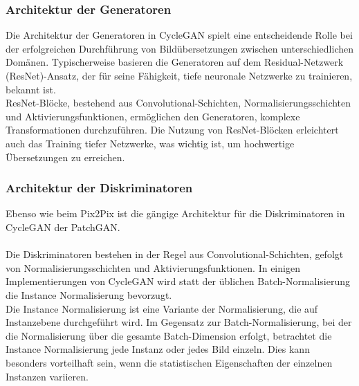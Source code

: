 \subsubsection{Architektur der Generatoren}
Die Architektur der Generatoren in CycleGAN spielt eine entscheidende Rolle bei der erfolgreichen Durchführung von Bildübersetzungen zwischen unterschiedlichen Domänen. Typischerweise basieren die Generatoren auf dem Residual-Netzwerk (ResNet)-Ansatz, der für seine Fähigkeit, tiefe neuronale Netzwerke zu trainieren, bekannt ist.
\\
ResNet-Blöcke, bestehend aus Convolutional-Schichten, Normalisierungsschichten und Aktivierungsfunktionen, ermöglichen den Generatoren, komplexe Transformationen durchzuführen. Die Nutzung von ResNet-Blöcken erleichtert auch das Training tiefer Netzwerke, was wichtig ist, um hochwertige Übersetzungen zu erreichen.

\subsubsection{Architektur der Diskriminatoren}
Ebenso wie beim Pix2Pix ist die gängige Architektur für die Diskriminatoren in CycleGAN der PatchGAN. 
\\
\\
Die Diskriminatoren bestehen in der Regel aus Convolutional-Schichten, gefolgt von Normalisierungsschichten und Aktivierungsfunktionen. In einigen Implementierungen von CycleGAN wird statt der üblichen Batch-Normalisierung die Instance Normalisierung bevorzugt.
\\
Die Instance Normalisierung ist eine Variante der Normalisierung, die auf Instanzebene durchgeführt wird. Im Gegensatz zur Batch-Normalisierung, bei der die Normalisierung über die gesamte Batch-Dimension erfolgt, betrachtet die Instance Normalisierung jede Instanz oder jedes Bild einzeln. Dies kann besonders vorteilhaft sein, wenn die statistischen Eigenschaften der einzelnen Instanzen variieren.

